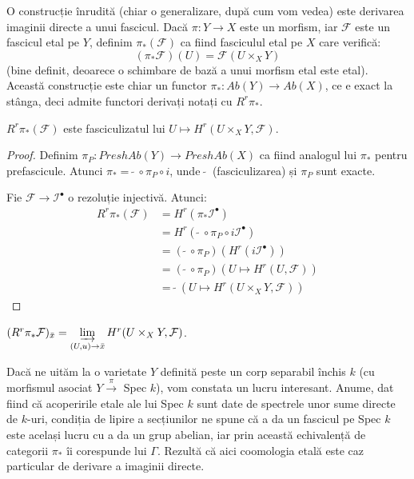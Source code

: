 \documentclass[13pt,openany,oneside]{book}
\begin{document}
O construcție înrudită (chiar o generalizare, după cum vom vedea) este derivarea imaginii directe a unui fascicul. Dacă $\pi: Y \rightarrow X$ este un morfism, iar $\mathcal{F}$ este un fascicul etal pe $Y$, definim $\pi_*(\mathcal{F})$ ca fiind fasciculul etal pe $X$ care verifică:
$$(\pi_*\mathcal{F})(U)=\mathcal{F}(U\times_X Y)$$
(bine definit, deoarece o schimbare de bază a unui morfism etal este etal). Această construcție este chiar un functor $\pi_*: Ab(Y) \rightarrow Ab(X)$, ce e exact la stânga, deci admite functori derivați notați cu $R^r\pi_*$.

\begin{prop}
$R^r\pi_*(\mathcal{F})$ este fasciculizatul lui $U \mapsto H^r(U \times_X Y, \mathcal{F})$.
\end{prop}

\begin{proof}
Definim $\pi_P: PreshAb(Y) \rightarrow PreshAb(X)$ ca fiind analogul lui $\pi_*$ pentru prefascicule. Atunci $\pi_* =\  \widetilde{}\ \circ \pi_P \circ i$, unde $\ \widetilde{}\ $ (fasciculizarea) și $\pi_P$ sunt exacte.

Fie $\mathcal{F} \rightarrow \mathcal{I}^\bullet$ o rezoluție injectivă. Atunci:
\begin{align*}
R^r\pi_*(\mathcal{F}) &= H^r(\pi_*\mathcal{I}^\bullet)\\
&= H^r (\ \widetilde{}\ \circ \pi_P \circ i\mathcal{I}^\bullet)\\
&= (\ \widetilde{}\ \circ \pi_P)(H^r(i\mathcal{I}^\bullet))\\
&=(\ \widetilde{}\ \circ \pi_P)(U \mapsto H^r(U, \mathcal{F}))\\
&=\ \widetilde{}\ (U \mapsto H^r(U \times_X Y, \mathcal{F}))
\end{align*}
\end{proof}

\begin{cor}
$(R^r\pi_*\mathcal{F})_{\bar{x}} = \varinjlim\limits_{(U,u) \rightarrow \bar{x}} H^r(U \times_X Y, \mathcal{F})$.
\end{cor}

Dacă ne uităm la o varietate $Y$ definită peste un corp separabil închis $k$ (cu morfismul asociat $Y \xrightarrow{\pi}$ Spec $k$), vom constata un lucru interesant. Anume, dat fiind că acoperirile etale ale lui Spec $k$ sunt date de spectrele unor sume directe de $k$-uri, condiția de lipire a secțiunilor ne spune că a da un fascicul pe Spec $k$ este același lucru cu a da un grup abelian, iar prin această echivalență de categorii $\pi_*$ îi corespunde lui $\Gamma$. Rezultă că aici coomologia etală este caz particular de derivare a imaginii directe.
\end{document}
